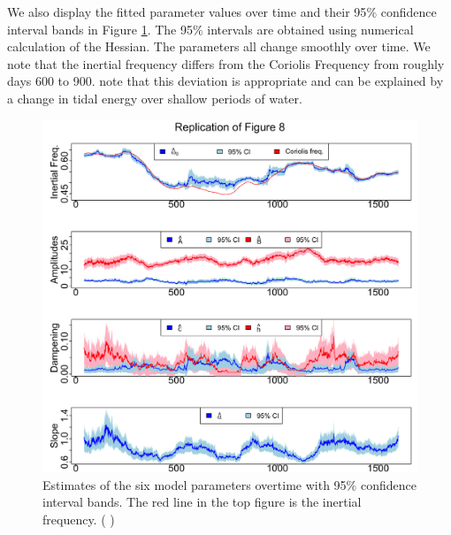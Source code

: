 \documentclass{stat572Style}
\newcommand{\vmcomment}[1]{({\color{blue}{VM's comment:}} \textbf{\color{blue}{#1}})}
\begin{document}
   
 \par
 We also display the fitted parameter values over time and their 95$\%$ confidence interval bands in Figure \ref{fig: fig8}. 
The 95$\%$ intervals are obtained using numerical calculation of the Hessian.
The parameters all change smoothly over time. 
We note that the inertial frequency differs from the Coriolis Frequency from roughly days 600 to 900. 
\citet{Sykulski2016} note that this deviation is appropriate and can be explained by a change in tidal energy over shallow periods of water. 
 \begin{figure}[h!]
  \centering
    \includegraphics[width=\textwidth]{ReplicatedFigures/fig8.png}
        \caption{Estimates of the six model parameters overtime with 95$\%$ confidence interval bands. The red line in the top figure is the inertial frequency. \vmcomment{Add x-axis label to the bottom plot.}}
        	\label{fig: fig8}
\end{figure}
\end{document}
